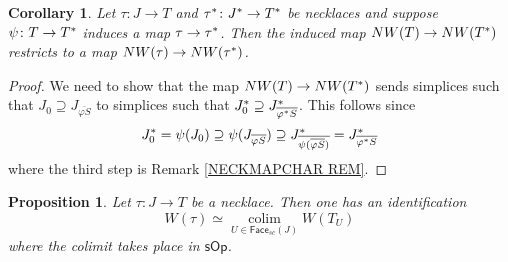 \documentclass[a4paper,10pt
,draft
]{article}%
\numberwithin{equation}{section}
\numberwithin{figure}{section}
\newtheorem{proposition}[equation]{Proposition}%
\newtheorem{corollary}[equation]{Corollary}%
\theoremstyle{definition} %
\DeclareMathOperator{\colim}{colim}%
\newcommand{\1}{\ensuremath{\mathbbm 1}}%
\begin{document}
\begin{corollary}
	Let $\tau \colon J \to T$ and
	$\tau^{\**} \colon J^{\**} \to T^{\**}$
	be necklaces and suppose 
	$\psi \colon T\to T^{\**}$
	induces a map $\tau \to \tau^{\**}$.
%	
	Then the induced map
	$NW(T) \to NW(T^{\**})$
	restricts to a map
	$NW(\tau) \to NW(\tau^{\**})$.
\end{corollary}



\begin{proof}
	We need to show that the 
	map
	$NW(T) \to NW(T^{\**})$
	sends simplices such that
	$J_0 \supseteq 
	J_{\overline{\varphi S}}$
	to simplices such that
	$J^{\**}_0 \supseteq 
	J^{\**}_{\overline{\varphi^{\**} S}}$.
	This follows since
\[
	J^{\**}_0 = 
	\psi (J_0) \supseteq
	\psi (J_{\overline{\varphi S}})
	\supseteq
	J^{\**}_{\overline{\psi (\overline{\varphi S})}}
	=
	J^{\**}_{\overline{\varphi^{\**} S}}
\]	
where the third step is
Remark \ref{NECKMAPCHAR REM}.
\end{proof}





\begin{proposition}\label{NECKCOL PROP}
	Let $\tau \colon J \to T$ be a necklace.
	Then one has an identification
\begin{equation}\label{NECKCOL EQ}
	W(\tau)
	\simeq 
	\underset{U \in \mathsf{Face}_{sc}(J)}{\colim}
	W(T_U)
\end{equation}
	where the colimit takes place 
	in $\mathsf{sOp}$.
\end{proposition}
\end{document}
